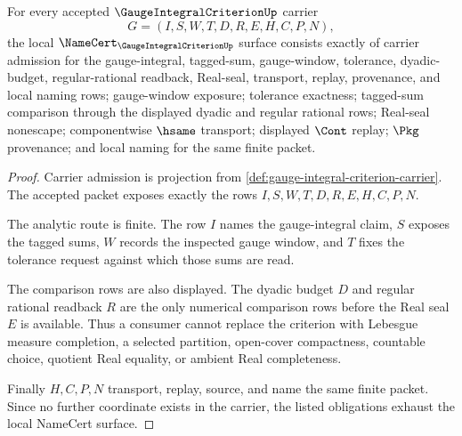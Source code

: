 \begin{theorem}
\label{thm:gauge-integral-criterion-namecert-obligations}
For every accepted $\GaugeIntegralCriterionUp$ carrier
$$
G=(I,S,W,T,D,R,E,H,C,P,N),
$$
the local $\NameCert_{\GaugeIntegralCriterionUp}$ surface consists exactly of carrier admission for the gauge-integral, tagged-sum, gauge-window, tolerance, dyadic-budget, regular-rational readback, Real-seal, transport, replay, provenance, and local naming rows; gauge-window exposure; tolerance exactness; tagged-sum comparison through the displayed dyadic and regular rational rows; Real-seal nonescape; componentwise $\hsame$ transport; displayed $\Cont$ replay; $\Pkg$ provenance; and local naming for the same finite packet.
\end{theorem}
\begin{proof}
Carrier admission is projection from \autoref{def:gauge-integral-criterion-carrier}. The accepted packet exposes exactly the rows $I,S,W,T,D,R,E,H,C,P,N$.

The analytic route is finite. The row $I$ names the gauge-integral claim, $S$ exposes the tagged sums, $W$ records the inspected gauge window, and $T$ fixes the tolerance request against which those sums are read.

The comparison rows are also displayed. The dyadic budget $D$ and regular rational readback $R$ are the only numerical comparison rows before the Real seal $E$ is available. Thus a consumer cannot replace the criterion with Lebesgue measure completion, a selected partition, open-cover compactness, countable choice, quotient Real equality, or ambient Real completeness.

Finally $H,C,P,N$ transport, replay, source, and name the same finite packet. Since no further coordinate exists in the carrier, the listed obligations exhaust the local NameCert surface.
\end{proof}



